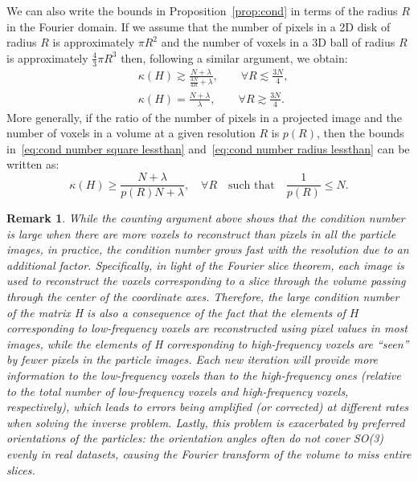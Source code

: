\documentclass{article}
\newtheorem{remark}[theorem]{Remark}%
\begin{document}
We can also write the bounds in Proposition~\ref{prop:cond} in terms of the  
radius $R$ in the Fourier domain. If we assume that the number of pixels in a 2D
disk of radius $R$ is approximately $\pi R^2$ and the number of voxels in a 3D
ball of radius $R$ is approximately $\frac{4}{3} \pi R^3$ then, following a similar 
argument, we obtain:
\begin{subequations}
    \begin{align}
        &\kappa(H) \gtrsim \frac{N+\lambda}{\frac{3N}{4R} + \lambda}, 
        \qquad \forall R \lesssim \frac{3N}{4},
        \label{eq:cond number radius lessthan}
        \\
        &\kappa(H) = \frac{N+\lambda}{\lambda}, 
        \qquad \forall R \gtrsim \frac{3N}{4}.
    \end{align}
    \label{eq:cond number radius}
\end{subequations}
More generally, if the ratio of the number of pixels in a projected image and the 
number of voxels in a volume at a given resolution $R$ is $p(R)$, then the bounds 
in~\eqref{eq:cond number square lessthan} and~\eqref{eq:cond number radius lessthan} 
can be written as:
\begin{equation}
    \kappa(H) \geq \frac{N + \lambda}{p(R) N + \lambda}, 
    \quad \forall R \quad \text{such that} \quad \frac{1}{p(R)} \leq N.
    \label{eq:cond number p}
\end{equation}

\begin{remark}
    While the counting argument above shows that the condition number is large when 
    there are more voxels to reconstruct than pixels in all the particle images, in 
    practice, the condition number grows fast with the resolution due to an additional 
    factor. Specifically, in light of the Fourier slice theorem, each image is used 
    to reconstruct the voxels corresponding to a slice through the volume passing 
    through the center of the coordinate axes. Therefore, the large condition number 
    of the matrix H is also a consequence of the fact that the elements of $H$ 
    corresponding to low-frequency voxels are reconstructed using pixel values in 
    most images, while the elements of H corresponding to high-frequency voxels are 
    ``seen'' by fewer pixels in the particle images. Each new iteration will provide 
    more information to the low-frequency voxels than to the high-frequency ones 
    (relative to the total number of low-frequency voxels and high-frequency voxels,
    respectively), which leads to errors being amplified (or corrected) at different 
    rates when solving the inverse problem. Lastly, this problem is exacerbated by 
    preferred orientations of the particles: the orientation angles often do not cover 
    SO(3) evenly in real datasets, causing the Fourier transform of the volume to miss 
    entire slices.
\end{remark}
\end{document}

